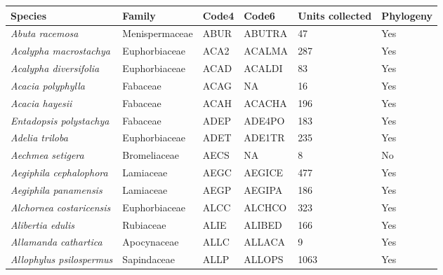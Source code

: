 \documentclass[11pt]{article}
\begin{document}
\footnotesize
\begin{longtable}{@{}llllll@{}}
\toprule
Species                                               & Family           & Code4  & Code6  & Units collected & Phylogeny \\* \midrule
\endfirsthead
\endhead
\bottomrule
\endfoot
\endlastfoot
\textit{Abuta racemosa}                               & Menispermaceae   & ABUR   & ABUTRA & 47              & Yes       \\
\textit{Acalypha macrostachya}                        & Euphorbiaceae    & ACA2   & ACALMA & 287             & Yes       \\
\textit{Acalypha diversifolia}                        & Euphorbiaceae    & ACAD   & ACALDI & 83              & Yes       \\
\textit{Acacia polyphylla}                            & Fabaceae         & ACAG   & NA     & 16              & Yes       \\
\textit{Acacia hayesii}                               & Fabaceae         & ACAH   & ACACHA & 196             & Yes       \\
\textit{Entadopsis polystachya}                       & Fabaceae         & ADEP   & ADE4PO & 183             & Yes       \\
\textit{Adelia triloba}                               & Euphorbiaceae    & ADET   & ADE1TR & 235             & Yes       \\
\textit{Aechmea setigera}                             & Bromeliaceae     & AECS   & NA     & 8               & No        \\
\textit{Aegiphila cephalophora}                       & Lamiaceae        & AEGC   & AEGICE & 477             & Yes       \\
\textit{Aegiphila panamensis}                         & Lamiaceae        & AEGP   & AEGIPA & 186             & Yes       \\
\textit{Alchornea costaricensis}                      & Euphorbiaceae    & ALCC   & ALCHCO & 323             & Yes       \\
\textit{Alibertia edulis}                             & Rubiaceae        & ALIE   & ALIBED & 166             & Yes       \\
\textit{Allamanda cathartica}                         & Apocynaceae      & ALLC   & ALLACA & 9               & Yes       \\
\textit{Allophylus psilospermus}                      & Sapindaceae      & ALLP   & ALLOPS & 1063            & Yes       \\

\end{longtable}
\end{document}
